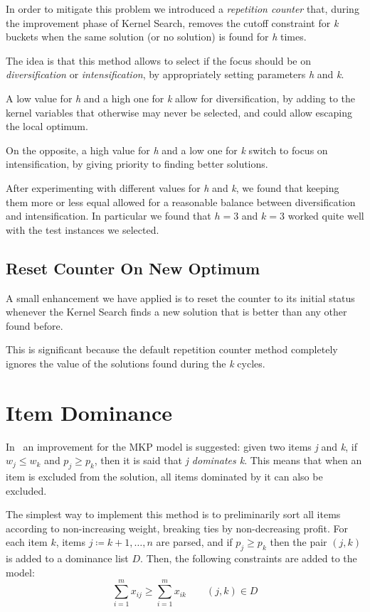 In order to mitigate this problem we introduced a \textit{repetition counter}
that, during the improvement phase of Kernel Search,
removes the cutoff constraint for \textit{k} buckets
when the same solution (or no solution) is found for \textit{h} times.

The idea is that this method allows to select if the focus should be on
\textit{diversification} or \textit{intensification},
by appropriately setting parameters \textit{h} and \textit{k}.

A low value for \textit{h} and a high one for \textit{k} allow for
diversification, by adding to the kernel variables that otherwise
may never be selected, and could allow escaping the local optimum.

On the opposite, a high value for \textit{h} and a low one for \textit{k}
switch to focus on intensification, by giving priority to finding
better solutions.

After experimenting with different values for \textit{h} and \textit{k},
we found that keeping them more or less equal allowed for
a reasonable balance between diversification and intensification.
In particular we found that \(h=3\) and \(k=3\) worked quite well
with the test instances we selected.

\subsection{Reset Counter On New Optimum}
A small enhancement we have applied is to reset the counter to its initial status
whenever the Kernel Search finds a new solution
that is better than any other found before.

This is significant because the default repetition counter
method completely ignores the value of the solutions found
during the \textit{k} cycles.


\section{Item Dominance}
In~\cite{mkp:2019} an improvement for the MKP model is suggested:
given two items \textit{j} and \textit{k}, if \(w_{j} \leq w_{k}\)
and \(p_{j} \geq p_{k}\), then it is said that \textit{j dominates k}.
This means that when an item is excluded from the solution,
all items dominated by it can also be excluded.

The simplest way to implement this method is to preliminarily sort all
items according to non-increasing weight, breaking ties by
non-decreasing profit.
For each item \(k\), items \(j \coloneqq k+1,\dots,n\) are parsed,
and if \(p_{j} \geq p_{k}\) then the pair \((j,k)\) is added to a
dominance list \(D\).
Then, the following constraints are added to the model:
\begin{equation}
    \label{eq:itemdom}
    \sum_{i=1}^{m} x_{ij} \geq \sum_{i=1}^{m} x_{ik} \qquad (j,k) \in D
\end{equation}

